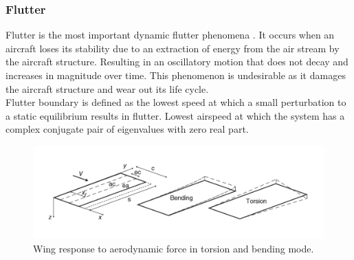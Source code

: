 \documentclass[11pt]{article}
\begin{document}
\subsubsection{Flutter}
Flutter is the most important dynamic flutter phenomena \cite{MohammedFREEWINGS}. It occurs when an aircraft loses its stability due to an extraction of energy from the air stream by the aircraft structure. Resulting in an oscillatory motion that does not decay and increases in magnitude over time. This phenomenon is undesirable as it damages the aircraft structure and wear out its life cycle.\\

Flutter boundary is defined as  the lowest speed at which a small perturbation to a static equilibrium results in flutter. Lowest airspeed at which the system has a complex conjugate pair of eigenvalues with zero real part. 
\begin{figure}[h]
    \centering
    \includegraphics[width = .8\textwidth]{figures/torsion-bending-modes.png}
    \caption{Wing response to aerodynamic force in torsion and bending mode.}
    \label{fig:binary}
\end{figure}
\end{document}
